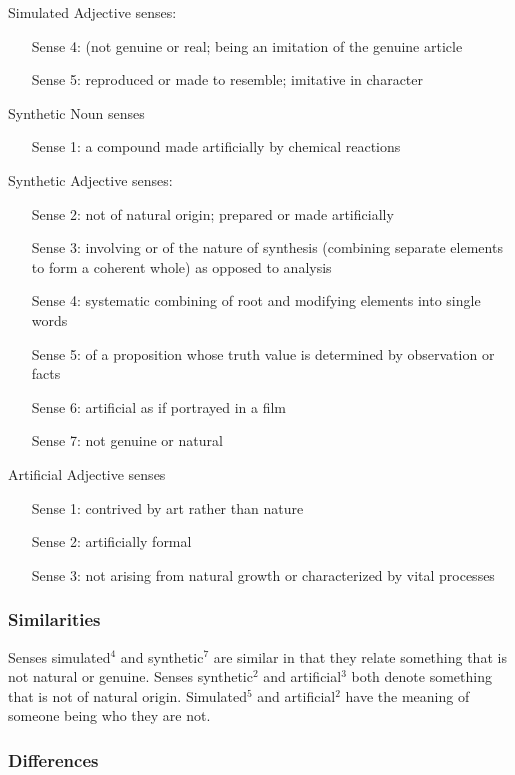 \documentclass[10pt,a4paper]{article}
\begin{document}
Simulated Adjective senses:
\begin{enumerate}
\item[Sense 4:] (not genuine or real; being an imitation of the genuine article
\item[Sense 5:] reproduced or made to resemble; imitative in character
\end{enumerate}

Synthetic Noun senses
\begin{enumerate}
\item[Sense 1:] a compound made artificially by chemical reactions
\end{enumerate}

Synthetic Adjective senses:
\begin{enumerate}
\item[Sense 2:] not of natural origin; prepared or made artificially
\item[Sense 3:] involving or of the nature of synthesis (combining separate elements to form a coherent whole) as opposed to analysis
\item[Sense 4:] systematic combining of root and modifying elements into single words
\item[Sense 5:] of a proposition whose truth value is determined by observation or facts
\item[Sense 6:] artificial as if portrayed in a film
\item[Sense 7:] not genuine or natural
\end{enumerate}

Artificial Adjective senses
\begin{enumerate}
\item[Sense 1:] contrived by art rather than nature
\item[Sense 2:] artificially formal
\item[Sense 3:] not arising from natural growth or characterized by vital processes
\end{enumerate}

\subsubsection{Similarities}
Senses simulated$^4$ and synthetic$^7$ are similar in that they relate something that is not natural or genuine.
Senses synthetic$^2$ and artificial$^3$ both denote something that is not of natural origin. 
Simulated$^5$ and artificial$^2$ have the meaning of someone being who they are not.

\subsubsection{Differences}
\end{document}
